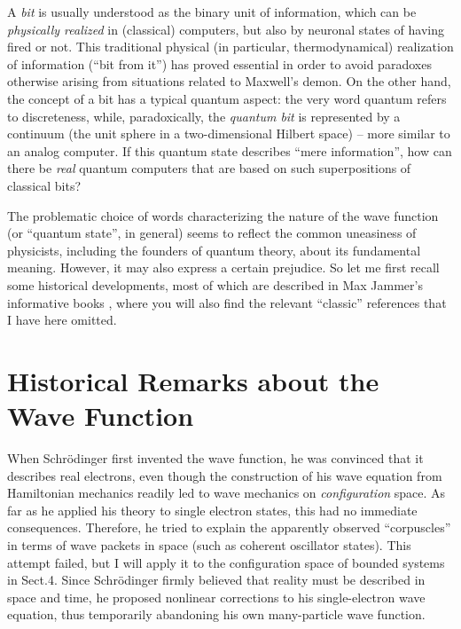 \documentclass[12pt]{article}
\newcommand{\ts}{\hspace{3pt}}
\begin{document}
A {\it bit} is usually understood as the binary unit of information,
which can be {\it physically realized} in (classical) computers, but
also by neuronal states of having fired or not. This traditional
physical (in particular, thermodynamical) realization of information
(``bit from it'') has proved essential in order to avoid
paradoxes otherwise arising from situations related to Maxwell's
demon. On the other hand, the concept of a bit has a typical quantum
aspect: the very word quantum refers to discreteness, while,
paradoxically, the {\it quantum bit} is represented by a continuum
(the unit sphere in a two-dimensional Hilbert space) -- more similar
to an analog computer. If this quantum state
describes ``mere information'', how can there be {\it real} quantum
computers that are based on such superpositions of classical bits?

The problematic choice of words characterizing the nature of the wave
function (or ``quantum state'', in general) seems to reflect the common
uneasiness of physicists, including the founders of quantum theory,
about its fundamental meaning. However, it may also express a certain
prejudice. So let me first recall some historical developments,
most of which are described in Max Jammer's informative
books \cite{Jammer}, where you will also find the relevant ``classic''
references that I have here omitted.


\section{Historical Remarks about the  Wave Function}
When Schr\"odinger first invented the wave function, he was
convinced that it  describes real electrons, even though the
construction of his wave equation from Hamiltonian mechanics readily
led to wave mechanics on {\it configuration} space. As far as he
applied his theory to single electron states, this had no immediate
consequences. Therefore, he tried to explain the apparently observed
``corpuscles'' in terms of wave packets in space (such as coherent
oscillator states). This attempt failed, but I will apply it to the
configuration space of bounded systems in Sect.\ts 4. Since
Schr\"odinger firmly believed that reality must be described in space
and time, he proposed nonlinear corrections to his single-electron
wave equation, thus temporarily abandoning his own many-particle wave
function.
\end{document}
